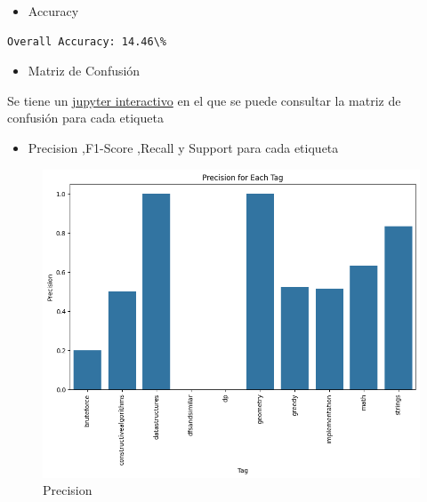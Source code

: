 \documentclass{article}
\begin{document}
\begin{itemize}
    \item Accuracy
\end{itemize}
\begin{verbatim}
Overall Accuracy: 14.46\%
\end{verbatim}

\begin{itemize}
    \item Matriz de Confusión
\end{itemize}
Se tiene un {\href{https://github.com/ARJ-Code/codeforce-tag-predictor/blob/main/src/naive\%20bayes\%20model/naive-bayes-model.ipynb}{jupyter interactivo}} en el que se puede consultar la matriz de confusión para cada etiqueta 
\newpage
\begin{itemize}
    \item Precision ,F1-Score ,Recall y Support para cada etiqueta
\end{itemize}
\begin{figure}[H]
    \centering
    \includegraphics[scale=0.49]{imgs/precisonnb.png}
    \caption{Precision}
    \label{fig:p}
\end{figure}
\end{document}
